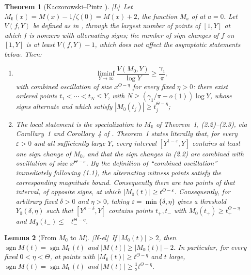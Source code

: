 \documentclass[11pt]{amsart}
\numberwithin{equation}{section}
\theoremstyle{plain}
\newtheorem{theorem}{Theorem}[section]
\newtheorem{lemma}[theorem]{Lemma}
\theoremstyle{definition}
\theoremstyle{remark}
\DeclareMathOperator{\sgn}{sgn}
\newcommand{\tagNE}{\textup{[N-el]}}
\newcommand{\tagL}{\textup{[L]}}
\begin{document}
\begin{theorem}[Kaczorowski--Pintz {\cite{KP86}}]
\label{thm:KP-quoted}
\tagL\ Let $M_0(x)=M(x)-1/\zeta(0)=M(x)+2$, the function $M_a$ of \cite{KP86} at
$a=0$. Let $V(f,Y)$ be defined as in \cite{KP86}, through the largest number of
points of $[1,Y]$ at which $f$ is nonzero with alternating signs; the number
of sign changes of $f$ on $[1,Y]$ is at least $V(f,Y)-1$, which does not
affect the asymptotic statements below. Then:
\begin{enumerate}[label=\textup{(\roman*)}]
\item \cite[Corollary~4, p.~178, (2.13)--(2.15)]{KP86}
\begin{equation}
\label{eq:KP-signchanges}
\liminf_{Y\to\infty}\frac{V(M_0,Y)}{\log Y}\ge\frac{\gamma_1}{\pi},
\end{equation}
with combined oscillation of size $x^{\Theta-\eta}$ for every fixed
$\eta>0$: there exist ordered points $t_1<\cdots<t_N\le Y$, with
$N\ge(\gamma_1/\pi-o(1))\log Y$, whose signs alternate and which satisfy
$|M_0(t_j)|\ge t_j^{\Theta-\eta}$;
\item The local statement is the specialization to $M_0$ of
Theorem~1, (2.2)--(2.3), via Corollary~1 and Corollary~4 of \cite{KP86}.
Theorem~1 states literally that, for every $\varepsilon>0$ and all
sufficiently large $Y$, every interval $[Y^{1-\varepsilon},Y]$ contains at
least one sign change of $M_0$, and that the sign changes in (2.2) are
combined with oscillation of size $x^{\Theta-\varepsilon}$.  By the
definition of ``combined oscillation'' immediately following (1.1), the
alternating witness points satisfy the corresponding magnitude bound.
Consequently there are two points of that interval, of opposite signs, at
which $|M_0(t)|\ge t^{\Theta-\varepsilon}$.  Consequently, for arbitrary fixed
$\delta>0$ and $\eta>0$, taking
$\varepsilon=\min\{\delta,\eta\}$ gives a threshold
$Y_0(\delta,\eta)$ such that $[Y^{1-\delta},Y]$ contains points $t_+,t_-$
with
$M_0(t_+)\ge t_+^{\Theta-\eta}$ and
$M_0(t_-)\le-t_-^{\Theta-\eta}$.
\end{enumerate}
\end{theorem}

\begin{lemma}[From $M_0$ to $M$]
\label{lem:KP-translation}
\tagNE\ If $|M_0(t)|>2$, then $\sgn M(t)=\sgn M_0(t)$ and
$|M(t)|\ge|M_0(t)|-2$. In particular, for every fixed $0<\eta<\Theta$, at points with
$|M_0(t)|\ge t^{\Theta-\eta}$ and $t$ large,
$\sgn M(t)=\sgn M_0(t)$ and $|M(t)|\ge\frac12t^{\Theta-\eta}$.
\end{lemma}
\end{document}
